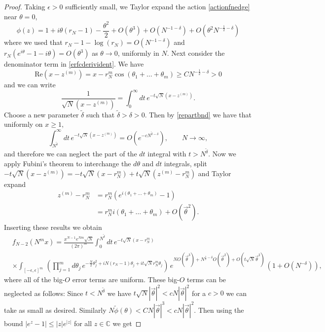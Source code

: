 \documentclass[11pt,reqno]{amsproc}
\numberwithin{equation}{section}
\numberwithin{theorem}{section}
\begin{document}
\begin{proof}
Taking $\epsilon>0$ sufficiently small, we Taylor expand the action \eqref{actionfnedge} near $\theta=0$,
\begin{equation}
\phi(z) = 1+i\theta(r_{N}-1)-\frac{\theta^{2}}{2}+O(\theta^{3})+O(N^{-1-\delta}) + O(\theta^{2}N^{-\frac{1}{2}-\delta})
\end{equation}
where we used that $r_{N}-1-\log(r_{N}) = O(N^{-1-\delta})$ and $r_{N}(e^{i\theta}-1-i\theta) = O(\theta^{3})$ as $\theta \to 0$, uniformly in $N$. Next consider the denominator term in \eqref{erfcderivident}. We have
\begin{equation}
\mathrm{Re}(x-z^{(m)}) = x-r_{N}^{m}\cos(\theta_1+\ldots+\theta_m) \geq CN^{-\frac{1}{2}-\delta} > 0\label{repartbnd}
\end{equation}
and we can write
\begin{equation}
\frac{1}{\sqrt{N}(x-z^{(m)})}= \int_{0}^{\infty}dt\,e^{-t\sqrt{N}(x-z^{(m)})}. \label{expintrep}
\end{equation}
Choose a new parameter $\tilde{\delta}$ such that $\tilde{\delta} > \delta > 0$. Then by \eqref{repartbnd} we have that uniformly on $x \geq 1$,
\begin{equation}
\int_{N^{\tilde{\delta}}}^{\infty}dt\,e^{-t\sqrt{N}(x-z^{(m)})} = O(e^{-cN^{\tilde{\delta}-\delta}}), \qquad N \to \infty,
\end{equation}
and therefore we can neglect the part of the $dt$ integral with $t>N^{\tilde{\delta}}$. Now we apply Fubini's theorem to interchange the $d\theta$ and $dt$ integrals, split $-t\sqrt{N}(x-z^{(m)}) = -t\sqrt{N}(x-r_{N}^{m}) +  t\sqrt{N}(z^{(m)}-r_{N}^{m})$ and Taylor expand 
\begin{align}
z^{(m)}-r_{N}^{m} &= r_{N}^{m}(e^{i(\theta_1+\ldots+\theta_m)}-1)\\
&= r_{N}^{m}i(\theta_1+\ldots+\theta_{m}) + O(\vec{\theta}^{2}).
\end{align}
Inserting these results we obtain
\begin{align}
&f_{N-2}(N^{m}x) = \frac{x^{N-1}e^{Nm}\sqrt{N}}{(2\pi)^{m}}\int_{0}^{N^{\tilde{\delta}}}dt\,e^{-t\sqrt{N}(x-r_{N}^{m})}\\
&\times \int_{[-\epsilon,\epsilon]^{m}}\,\left(\prod_{j=1}^{m}d\theta_{j}\,e^{-\frac{N}{2}\theta_{j}^{2}+iN(r_{N}-1)\theta_{j}+it\sqrt{N}r_{N}^{m}\theta_{j}}\right)\,e^{NO(\vec{\theta}^{3})+N^{\frac{1}{2}-\delta}O(\vec{\theta}^{2})+O(t\sqrt{N}\vec{\theta}^{2})}\,(1+O(N^{-\delta})), \label{bigoexp}
\end{align}
where all of the big-$O$ error terms are uniform. These big-$O$ terms can be neglected as follows: Since $t < N^{\tilde{\delta}}$ we have $t\sqrt{N}|\vec{\theta}|^{2} < cN|\vec{\theta}|^{2}$ for a $c>0$ we can take as small as desired. Similarly $N\tilde{\phi}(\theta) < CN|\vec{\theta}|^{3} < cN|\vec{\theta}|^{2}$. Then using the bound $|e^{z}-1| \leq |z|e^{|z|}$ for all $z \in \mathbb{C}$ we get

\end{proof}
\end{document}
